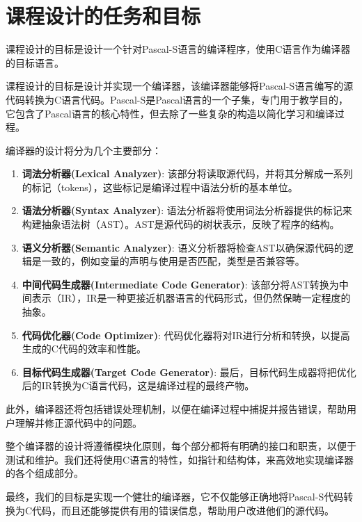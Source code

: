 \documentclass[../main.tex]{subfiles}
\begin{document}
\section{课程设计的任务和目标}

课程设计的目标是设计一个针对Pascal-S语言的编译程序，使用C语言作为编译器的目标语言。

课程设计的目标是设计并实现一个编译器，该编译器能够将Pascal-S语言编写的源代码转换为C语言代码。Pascal-S是Pascal语言的一个子集，专门用于教学目的，它包含了Pascal语言的核心特性，但去除了一些复杂的构造以简化学习和编译过程。

编译器的设计将分为几个主要部分：

\begin{enumerate}
  \item \textbf{词法分析器(Lexical Analyzer)}: 该部分将读取源代码，并将其分解成一系列的标记（tokens），这些标记是编译过程中语法分析的基本单位。
  \item \textbf{语法分析器(Syntax Analyzer)}: 语法分析器将使用词法分析器提供的标记来构建抽象语法树（AST）。AST是源代码的树状表示，反映了程序的结构。
  \item \textbf{语义分析器(Semantic Analyzer)}: 语义分析器将检查AST以确保源代码的逻辑是一致的，例如变量的声明与使用是否匹配，类型是否兼容等。
\item \textbf{中间代码生成器(Intermediate Code Generator)}: 该部分将AST转换为中间表示（IR），IR是一种更接近机器语言的代码形式，但仍然保畴一定程度的抽象。
  \item \textbf{代码优化器(Code Optimizer)}: 代码优化器将对IR进行分析和转换，以提高生成的C代码的效率和性能。
  \item \textbf{目标代码生成器(Target Code Generator)}: 最后，目标代码生成器将把优化后的IR转换为C语言代码，这是编译过程的最终产物。
\end{enumerate}

此外，编译器还将包括错误处理机制，以便在编译过程中捕捉并报告错误，帮助用户理解并修正源代码中的问题。

整个编译器的设计将遵循模块化原则，每个部分都将有明确的接口和职责，以便于测试和维护。我们还将使用C语言的特性，如指针和结构体，来高效地实现编译器的各个组成部分。

最终，我们的目标是实现一个健壮的编译器，它不仅能够正确地将Pascal-S代码转换为C代码，而且还能够提供有用的错误信息，帮助用户改进他们的源代码。
\end{document}
